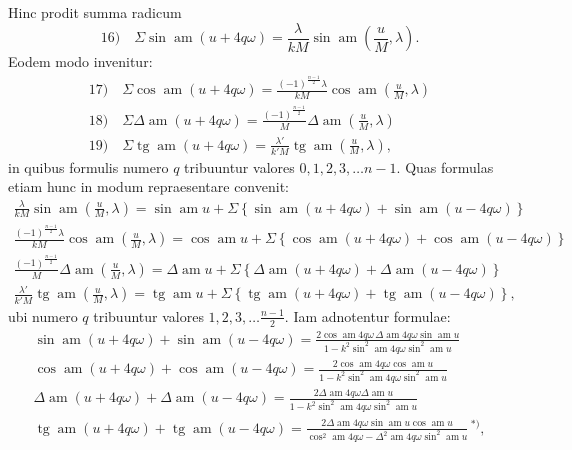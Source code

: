 \documentclass{article}
\begin{document}
Hinc prodit summa radicum
\[
\text{16)}\quad\Sigma\sin\operatorname{am}(u+4q\omega)=\frac{\lambda}{kM}\sin\operatorname{am}\left(\frac{u}{M},\lambda\right).
\]
Eodem modo invenitur:
\[
\begin{gathered}
\text{17)}\quad\Sigma\cos\operatorname{am}(u+4q\omega)=\frac{(-1)^{\frac{n-1}{2}}\lambda}{kM}\cos\operatorname{am}\left(\frac{u}{M},\lambda\right)\\[1.5ex]
\text{18)}\quad\Sigma\Delta\operatorname{am}(u+4q\omega)=\frac{(-1)^{\frac{n-1}{2}}}{M}\Delta\operatorname{am}\left(\frac{u}{M},\lambda\right)\\[1.5ex]
\text{19)}\quad\Sigma\operatorname{tg}\operatorname{am}(u+4q\omega)=\frac{\lambda'}{k'M}\operatorname{tg}\operatorname{am}\left(\frac{u}{M},\lambda\right),
\end{gathered}
\]
in quibus formulis numero $q$ tribuuntur valores $0,1,2,3,\ldots n-1$. Quas formulas etiam hunc in modum repraesentare convenit:
\[
\begin{gathered}
\frac{\lambda}{kM}\sin\operatorname{am}\left(\frac{u}{M},\lambda\right)=\sin\operatorname{am}u+\Sigma\left\{\sin\operatorname{am}(u+4q\omega)+\sin\operatorname{am}(u-4q\omega)\right\}\\[1.5ex]
\frac{(-1)^{\frac{n-1}{2}}\lambda}{kM}\cos\operatorname{am}\left(\frac{u}{M},\lambda\right)=\cos\operatorname{am}u+\Sigma\left\{\cos\operatorname{am}(u+4q\omega)+\cos\operatorname{am}(u-4q\omega)\right\}\\[1.5ex]
\frac{(-1)^{\frac{n-1}{2}}}{M}\Delta\operatorname{am}\left(\frac{u}{M},\lambda\right)=\Delta\operatorname{am}u+\Sigma\left\{\Delta\operatorname{am}(u+4q\omega)+\Delta\operatorname{am}(u-4q\omega)\right\}\\[1.5ex]
\frac{\lambda'}{k'M}\operatorname{tg}\operatorname{am}\left(\frac{u}{M},\lambda\right)=\operatorname{tg}\operatorname{am}u+\Sigma\left\{\operatorname{tg}\operatorname{am}(u+4q\omega)+\operatorname{tg}\operatorname{am}(u-4q\omega)\right\},
\end{gathered}
\]
ubi numero $q$ tribuuntur valores $1,2,3,\ldots\frac{n-1}{2}$. Iam adnotentur formulae:
\[
\begin{gathered}
\sin\operatorname{am}(u+4q\omega)+\sin\operatorname{am}(u-4q\omega)=\frac{2\cos\operatorname{am}4q\omega\,\Delta\operatorname{am}4q\omega\sin\operatorname{am}u}{1-k^{2}\sin^{2}\operatorname{am}4q\omega\sin^{2}\operatorname{am}u}\\[1.5ex]
\cos\operatorname{am}(u+4q\omega)+\cos\operatorname{am}(u-4q\omega)=\frac{2\cos\operatorname{am}4q\omega\cos\operatorname{am}u}{1-k^{2}\sin^{2}\operatorname{am}4q\omega\sin^{2}\operatorname{am}u}\\[1.5ex]
\Delta\operatorname{am}(u+4q\omega)+\Delta\operatorname{am}(u-4q\omega)=\frac{2\Delta\operatorname{am}4q\omega\Delta\operatorname{am}u}{1-k^{2}\sin^{2}\operatorname{am}4q\omega\sin^{2}\operatorname{am}u}\\[1.5ex]
\operatorname{tg}\operatorname{am}(u+4q\omega)+\operatorname{tg}\operatorname{am}(u-4q\omega)=\frac{2\Delta\operatorname{am}4q\omega\sin\operatorname{am}u\cos\operatorname{am}u}{\cos^{2}\operatorname{am}4q\omega-\Delta^{2}\operatorname{am}4q\omega\sin^{2}\operatorname{am}u}\,{}^{*)},
\end{gathered}
\]
\end{document}
